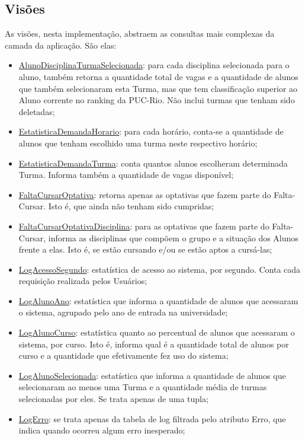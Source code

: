 \documentclass[graduacao,brazil]{ThesisPUC}
\begin{document}
\subsection{Visões}

As visões, nesta implementação, abstraem as consultas mais complexas da camada da aplicação. São elas:

\begin{itemize}
	\item \underline{AlunoDisciplinaTurmaSelecionada}: para cada disciplina selecionada para o aluno, também retorna a quantidade total de vagas e a quantidade de alunos que também selecionaram esta Turma, mas que tem classificação superior ao Aluno corrente no ranking da PUC-Rio. Não inclui turmas que tenham sido deletadas;
	\item \underline{EstatisticaDemandaHorario}: para cada horário, conta-se a quantidade de alunos que tenham escolhido uma turma neste respectivo horário;
	\item \underline{EstatisticaDemandaTurma}: conta quantos alunos escolheram determinada Turma. Informa também a quantidade de vagas disponível;
	\item \underline{FaltaCursarOptativa}: retorna apenas as optativas que fazem parte do Falta-Cursar. Isto é, que ainda não tenham sido cumpridas;
	\item \underline{FaltaCursarOptativaDisciplina}: para as optativas que fazem parte do Falta-Cursar, informa as disciplinas que compõem o grupo e a situação dos Alunos frente a elas. Isto é, se estão cursando e/ou se estão aptos a cursá-las;
	\item \underline{LogAcessoSegundo}: estatística de acesso ao sistema, por segundo. Conta cada requisição realizada pelos Usuários;
	\item \underline{LogAlunoAno}: estatística que informa a quantidade de alunos que acessaram o sistema, agrupado pelo ano de entrada na universidade;
	\item \underline{LogAlunoCurso}: estatística quanto ao percentual de alunos que acessaram o sistema, por curso. Isto é, informa qual é a quantidade total de alunos por curso e a quantidade que efetivamente fez uso do sistema;
	\item \underline{LogAlunoSelecionada}: estatística que informa a quantidade de alunos que selecionaram ao menos uma Turma e a quantidade média de turmas selecionadas por eles. Se trata apenas de uma tupla;
	\item \underline{LogErro}: se trata apenas da tabela de log filtrada pelo atributo Erro, que indica quando ocorreu algum erro inesperado;

\end{itemize}
\end{document}
